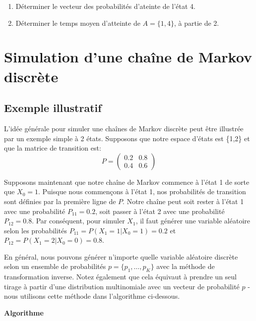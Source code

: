 \documentclass[
]{book}
\providecommand{\tightlist}{%
  \setlength{\itemsep}{0pt}\setlength{\parskip}{0pt}}
\theoremstyle{definition}
\theoremstyle{definition}
\theoremstyle{definition}
\theoremstyle{remark}
\begin{document}
\begin{enumerate}
\def\labelenumi{\arabic{enumi})}
\tightlist
\item
  Déterminer le vecteur des probabilités d'ateinte de l'état 4.
\item
  Déterminer le temps moyen d'atteinte de \(A=\{1,4\}\), à partie de 2.
\end{enumerate}

\hypertarget{simulation-dune-chauxeene-de-markov-discruxe8te}{%
\section{Simulation d'une chaîne de Markov discrète}\label{simulation-dune-chauxeene-de-markov-discruxe8te}}

\hypertarget{exemple-illustratif}{%
\subsection{Exemple illustratif}\label{exemple-illustratif}}

L'idée générale pour simuler une chaînes de Markov discrète peut être illustrée par un exemple simple à 2 états. Supposons que notre espace d'états est \{1,2\} et que la matrice de transition est:
\[ P=\left(
\begin{array}{cc}
0.2 & 0.8 \\
0.4 & 0.6
\end{array}
\right)\]

Supposons maintenant que notre chaîne de Markov commence à l'état 1 de sorte que \(X_0 = 1\). Puisque nous commençons à l'état 1, nos probabilités de transition sont définies par la première ligne de \(P\). Notre chaîne peut soit rester à l'état 1 avec une probabilité \(P_{11}=0.2\), soit passer à l'état 2 avec une probabilité \(P_{12}=0.8\). Par conséquent, pour simuler \(X_1\), il faut générer une variable aléatoire selon les probabilités \(P_{11} = P (X_1 = 1 | X_0 = 1) = 0.2\) et \(P_{12} = P (X_1 = 2 | X_0 = 0) = 0.8\).

En général, nous pouvons générer n'importe quelle variable aléatoire discrète selon un ensemble de probabilités \(p = \{p_1,\ldots, p_K\}\) avec la méthode de transformation inverse. Notez également que cela équivaut à prendre un seul tirage à partir d'une distribution multinomiale avec un vecteur de probabilité \(p\) - nous utilisons cette méthode dans l'algorithme ci-dessous.

\textbf{Algorithme}
\end{document}
